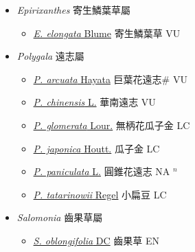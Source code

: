 
  \begin{itemize}
 \item[] \textit{Epirixanthes} 寄生鱗葉草屬
                    
  \begin{itemize}
        \item[] \href{http://www.theplantlist.org/tpl1.1/search?q=Epirixanthes+elongata}{\textit{E. elongata} Blume}   寄生鱗葉草 VU
  \end{itemize}
 \item[] \textit{Polygala} 遠志屬
                    
  \begin{itemize}
        \item[] \href{http://www.theplantlist.org/tpl1.1/search?q=Polygala+arcuata}{\textit{P. arcuata} Hayata}   巨葉花遠志\# VU
        \item[] \href{http://www.theplantlist.org/tpl1.1/search?q=Polygala+chinensis}{\textit{P. chinensis} L.}   華南遠志 VU
        \item[] \href{http://www.theplantlist.org/tpl1.1/search?q=Polygala+glomerata}{\textit{P. glomerata} Lour.}   無柄花瓜子金 LC
        \item[] \href{http://www.theplantlist.org/tpl1.1/search?q=Polygala+japonica}{\textit{P. japonica} Houtt.}   瓜子金 LC
        \item[] \href{http://www.theplantlist.org/tpl1.1/search?q=Polygala+paniculata}{\textit{P. paniculata} L.}   圓錐花遠志 NA $^n$
        \item[] \href{http://www.theplantlist.org/tpl1.1/search?q=Polygala+tatarinowii}{\textit{P. tatarinowii} Regel}   小扁豆 LC
  \end{itemize}
 \item[] \textit{Salomonia} 齒果草屬
                    
  \begin{itemize}
        \item[] \href{http://www.theplantlist.org/tpl1.1/search?q=Salomonia+oblongifolia}{\textit{S. oblongifolia} DC}   齒果草 EN
  \end{itemize}
  \end{itemize}
